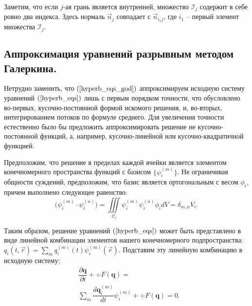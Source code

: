 \documentclass[14pt, a4paper, fleqn]{extreport}
\begin{document}
    Заметим, что если $j$-ая грань является внутренней, множество $\mathcal{I}_j$ содержит в себе ровно два индекса.
    Здесь нормаль $\vec{n}_j$ совпадает с $\vec{n}_{i_1 j}$, где $i_1$ -- первый элемент множества $\mathcal{I}_j$.
    
    \subsection{Аппроксимация уравнений разрывным методом Галеркина.}

    Нетрудно заменить, что $(\ref{hyperb_eqs_god})$ аппроксимируем исходную систему 
    уравнений $(\ref{hyperb_eqs})$ лишь с первым порядком точности,
    что обусловлено во-первых, кусочно-постоянной формой искомого решения, и, во-вторых, интегрированием потоков по формуле среднего.
    Для увеличения точности естественно было бы предложить аппроксимировать решение не кусочно-постоянной функций,
    а, например, кусочно-линейной или кусочно-квадратичной функцией.
    
    Предположим, что решение в пределах каждой ячейки является элементом
    конечномерного пространства функций с базисом ${\lbrace \psi_i^{(m)} \rbrace}$.
    Не ограничивая общности суждений, предположим, что базис является ортогональным с весом $\phi_i$, причем 
    выполнено следующее равенство:
    \begin{equation}
    \label{basis_cond}
        \Big(\psi_i^{(m)} \cdot \psi_i^{(n)} \Big)
            = \iiint\limits_{\mathcal{C}_i} \psi_i^{(m)} \psi_i^{(n)} \phi_i dV
            = \delta_{m,n} V_i.
    \end{equation}
    
    Таким образом, решение уравнений $(\ref{hyperb_eqs})$ может быть представлено в 
    виде линейной комбинации элементов нашего конечномерного 
    подпространства: $q_i(t, \vec{r}) = \sum\limits_m q_i^{(m)}(t)\psi_i^{(m)}(\vec{r})$.
    Подставим эту линейную комбинацию в исходную систему:
    \begin{equation*}
    \begin{split}
        &\dfrac{\partial \textbf{q}}{\partial t} + \div{F(\textbf{q})} = 
        \\
        &\sum\limits_m\dfrac{d \textbf{q}_i^{(m)}}{d t}\psi_i^{(m)} + \div{F(\textbf{q})} = 0.
    \end{split}
    \end{equation*}
    
\end{document}
